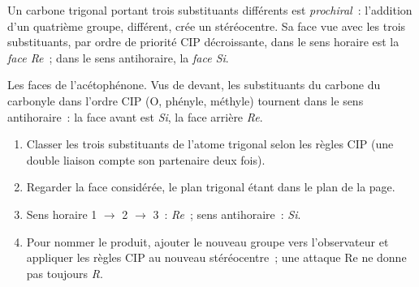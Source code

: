 \begin{definition}\label{def:b3:asymmetric-synthesis:faces}
Un carbone trigonal portant trois substituants différents est \emph{prochiral}~:
l'addition d'un quatrième groupe, différent, crée un stéréocentre. Sa face
vue avec les trois substituants, par ordre de priorité CIP décroissante,
dans le sens horaire est la \emph{face Re}~; dans le sens antihoraire, la \emph{face Si}.
\end{definition}

\begin{omfigure}

{\small Les faces de l'acétophénone. Vus de devant, les substituants du
carbone du carbonyle dans l'ordre CIP (O, phényle, méthyle) tournent dans
le sens antihoraire~: la face avant est \textit{Si}, la face arrière \textit{Re}.}
\end{omfigure}

\begin{method}\label{met:b3:asymmetric-synthesis:re-si}
\begin{enumerate}
  \item Classer les trois substituants de l'atome trigonal selon les règles
        CIP (une double liaison compte son partenaire deux fois).
  \item Regarder la face considérée, le plan trigonal étant dans le plan
        de la page.
  \item Sens horaire 1 $\to$ 2 $\to$ 3~: \textit{Re}~; sens antihoraire~: \textit{Si}.
  \item Pour nommer le produit, ajouter le nouveau groupe vers
        l'observateur et appliquer les règles CIP au nouveau stéréocentre~;
        une attaque Re ne donne pas toujours \textit{R}.
\end{enumerate}
\end{method}

